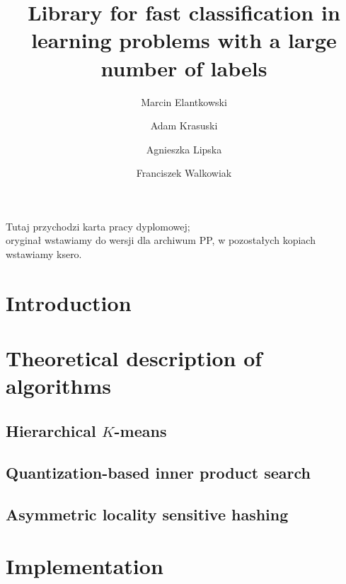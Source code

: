 \documentclass[english,bachelor,a4paper,twoside,11pt]{ppfcmthesis}
\author{Marcin Elantkowski \album{116353} \and
Adam Krasuski \album{122479} \and
Agnieszka Lipska\album{122467} \and
Franciszek Walkowiak \album{122592}}
\title{Library for fast classification in learning problems with a large number of labels}
\begin{document}
\frontmatter\pagestyle{empty}%
\maketitle\cleardoublepage%

\thispagestyle{empty}\vspace*{\fill}%
\begin{center}Tutaj przychodzi karta pracy dyplomowej;\\oryginał wstawiamy do wersji dla archiwum PP, w pozostałych kopiach wstawiamy ksero.\end{center}%
\vfill \cleardoublepage%

\pagestyle{ppfcmthesis}%

%

%

\tableofcontents* \cleardoublepage%



\mainmatter%
\chapter{Introduction}
	
	
\chapter{Theoretical description of algorithms}
	
	\section{Hierarchical $K$-means}
	
	\section{Quantization-based inner product search}
	
	\section{Asymmetric locality sensitive hashing}
	
\chapter{Implementation}
\end{document}

